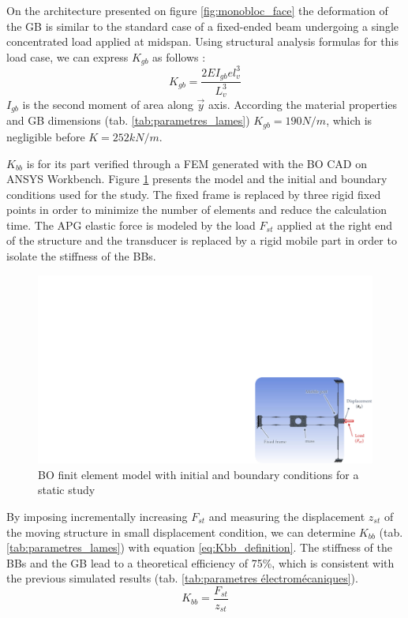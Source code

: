 \documentclass[3p,twocolumn,preprint]{elsarticle}
\begin{document}
On the architecture presented on figure \ref{fig:monobloc_face} the deformation of the GB is similar to the standard case of a fixed-ended beam undergoing a single concentrated load applied at midspan. Using structural analysis formulas for this load case, we can express $K_{gb}$ as follows \cite{Leet1993} :
\begin{equation}
	K_{gb} = \dfrac{2EI_{gb}el_v^3}{L_v^3}
	\label{eq:Kgb_definition}
\end{equation}
$I_{gb}$ is the second moment of area along $\vec{y}$ axis. According the material properties and GB dimensions (tab. \ref{tab:parametres_lames}) \mbox{$K_{gb} = 190N/m$}, which is negligible before \mbox{$K=252kN/m$}.

$K_{bb}$ is for its part verified through a FEM generated with the BO CAD on ANSYS Workbench. Figure \ref{fig:fem_statique} presents the model and the initial and boundary conditions used for the study. The fixed frame is replaced by three rigid fixed points in order to minimize the number of elements and reduce the calculation time. The APG elastic force is modeled by the load $F_{st}$ applied at the right end of the structure and the transducer is replaced by a rigid mobile part in order to isolate the stiffness of the BBs.
\begin{figure}[!htbp]
\centering
\captionsetup{justification=centering}
	\includegraphics[trim={21.9cm 0cm 0cm 10.2cm},clip,width=.8\linewidth]{figures/fem_statique.pdf}
	\caption{BO finit element model with initial and boundary conditions for a static study}
\label{fig:fem_statique}
\end{figure}
By imposing incrementally increasing $F_{st}$ and measuring the displacement $z_{st}$ of the moving structure in small displacement condition, we can determine $K_{bb}$ (tab. \ref{tab:parametres_lames}) with equation \ref{eq:Kbb_definition}. The stiffness of the BBs and the GB lead to a theoretical efficiency of 75\%, which is consistent with the previous simulated results (tab. \ref{tab:parametres électromécaniques}).
\begin{equation}
	K_{bb} = \dfrac{F_{st}}{z_{st}}
	\label{eq:Kbb_definition}
\end{equation}
\end{document}
